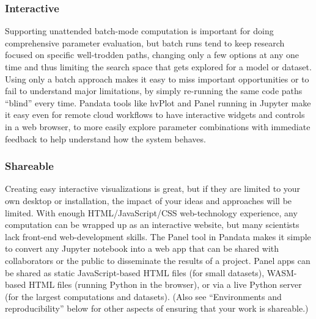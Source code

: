 \subsubsection{Interactive}
Supporting unattended batch-mode computation is important for doing comprehensive parameter evaluation, but batch runs tend to keep research focused on specific well-trodden paths, changing only a few options at any one time and thus limiting the search space that gets explored for a model or dataset. Using only a batch approach makes it easy to miss important opportunities or to fail to understand major limitations, by simply re-running the same code paths ``blind'' every time. Pandata tools like hvPlot and Panel running in Jupyter make it easy even for remote cloud workflows to have interactive widgets and controls in a web browser, to more easily explore parameter combinations with immediate feedback to help understand how the system behaves.

\subsubsection{Shareable}
Creating easy interactive visualizations is great, but if they are limited to your own desktop or installation, the impact of your ideas and approaches will be limited. With enough HTML/JavaScript/CSS web-technology experience, any computation can be wrapped up as an interactive website, but many scientists lack front-end web-development skills. The Panel tool in Pandata makes it simple to convert any Jupyter notebook into a web app that can be shared with collaborators or the public to disseminate the results of a project. Panel apps can be shared as static JavaScript-based HTML files (for small datasets), WASM-based HTML files (running Python in the browser), or via a live Python server (for the largest computations and datasets). (Also see ``Environments and reproducibility'' below for other aspects of ensuring that your work is shareable.)

